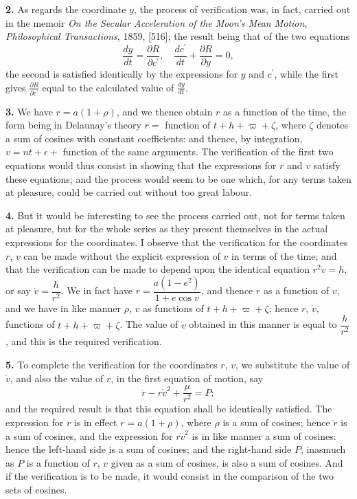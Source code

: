 \documentclass[12pt,a4paper]{article}
\begin{document}
\newpage
\textbf{2.} As regards the coordinate $y$, the process of verification was, in fact,
carried out in the memoir \textit{On the Secular Acceleration of the Moon's Mean Motion},
\textit{Philosophical Transactions}, 1859, [516]; the result being that of the two equations
\[
\frac{dy}{dt} = \frac{\partial R}{\partial c^\prime}, \quad \frac{dc^\prime}{dt} + \frac{\partial R}{\partial y} = 0,
\]
the second is satisfied identically by the expressions for $y$ and $c^\prime$, while the first gives
$\frac{\partial R}{\partial c^\prime}$ equal to the calculated value of $\frac{dy}{dt}$.

\textbf{3.} We have $r = a(1 + \rho)$, and we thence obtain $r$ as a function of the time, the
form being in Delaunay's theory $r =$ function of $t + h + \varpi + \zeta$, where $\zeta$ denotes a sum of
cosines with constant coefficients: and thence, by integration, $v = n t + \epsilon +$ function
of the same arguments. The verification of the first two equations would thus
consist in showing that the expressions for $r$ and $v$ satisfy these equations; and the
process would seem to be one which, for any terms taken at pleasure, could be
carried out without too great labour.

\textbf{4.} But it would be interesting to see the process carried out, not for terms
taken at pleasure, but for the whole series as they present themselves in the actual
expressions for the coordinates. I observe that the verification for the coordinates
$r$, $v$ can be made without the explicit expression of $v$ in terms of the time; and that
the verification can be made to depend upon the identical equation $r^2\dot{v} = h$, or say
$\dot{v} = \dfrac{h}{r^2}$. We in fact have $r = \dfrac{a(1-e^2)}{1+e\cos v}$, and thence $r$ as a function of $v$, and we
have in like manner $\rho$, $v$ as functions of $t + h + \varpi + \zeta$; hence $r$, $\dot{v}$, functions of
$t + h + \varpi + \zeta$. The value of $\dot{v}$ obtained in this manner is equal to $\dfrac{h}{r^2}$, and this is
the required verification.

\newpage
\textbf{5.} To complete the verification for the coordinates $r$, $v$, we substitute the
value of $\dot{v}$, and also the value of $r$, in the first equation of motion, say
\[
\ddot{r} - r\dot{v}^2 + \frac{\mu}{r^2} = P;
\]
and the required result is that this equation shall be identically satisfied. The
expression for $r$ is in effect $r = a(1 + \rho)$, where $\rho$ is a sum of cosines; hence $\ddot{r}$ is a sum
of cosines, and the expression for $r\dot{v}^2$ is in like manner a sum of cosines: hence the
left-hand side is a sum of cosines; and the right-hand side $P$, inasmuch as $P$ is a
function of $r$, $v$ given as a sum of cosines, is also a sum of cosines. And if the
verification is to be made, it would consist in the comparison of the two sets of
cosines.
\end{document}
